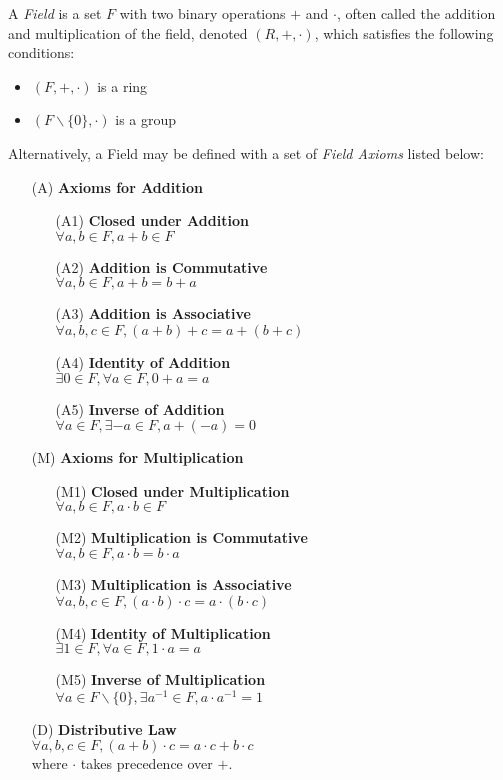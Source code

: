 \documentclass{report}
\begin{document}
		\begin{defn}[Field] \label{def_field}
			A \emph{Field} is a set $F$ with two binary operations $+$ and $\cdot$, often called the addition and multiplication of the field, denoted $(R,+,\cdot)$, which satisfies the following conditions:
			\begin{itemize}
				\item $(F,+,\cdot)$ is a ring
				\item $(F\backslash \{0\},\cdot)$ is a group
			\end{itemize}
			Alternatively, a Field may be defined with a set of \emph{Field Axioms} listed below:
			\begin{itemize}
					\item[(A)] \textbf{Axioms for Addition}
					\begin{itemize}
						\item[(A1)] \textbf{Closed under Addition}\\$\forall a,b \in F, a+b \in F$
						\item[(A2)] \textbf{Addition is Commutative}\\$\forall a,b \in F, a+b=b+a$
						\item[(A3)] \textbf{Addition is Associative}\\$\forall a,b,c \in F, (a+b)+c=a+(b+c)$
						\item[(A4)] \textbf{Identity of Addition}\\$\exists 0 \in F, \forall a \in F, 0+a=a$
						\item[(A5)] \textbf{Inverse of Addition}\\$\forall a \in F, \exists -a \in F, a+(-a)=0$
					\end{itemize}
					\item[(M)] \textbf{Axioms for Multiplication}
					\begin{itemize}
						\item[(M1)] \textbf{Closed under Multiplication}\\$\forall a,b \in F, a \cdot b \in F$
						\item[(M2)] \textbf{Multiplication is Commutative}\\$\forall a,b \in F, a \cdot b=b \cdot a$
						\item[(M3)] \textbf{Multiplication is Associative}\\$\forall a,b,c \in F, (a \cdot b) \cdot c=a \cdot (b \cdot c)$
						\item[(M4)] \textbf{Identity of Multiplication}\\$\exists 1 \in F, \forall a \in F, 1 \cdot a=a$
						\item[(M5)] \textbf{Inverse of Multiplication}\\$\forall a \in F\backslash\{0\}, \exists a^{-1} \in F, a \cdot a^{-1}=1$
					\end{itemize}
				\item[(D)] \textbf{Distributive Law}
				\\$\forall a,b,c \in F, (a+b) \cdot c=a \cdot c+b \cdot c$\\where $\cdot$ takes precedence over $+$.
			\end{itemize}
		\end{defn}
		
\end{document}

